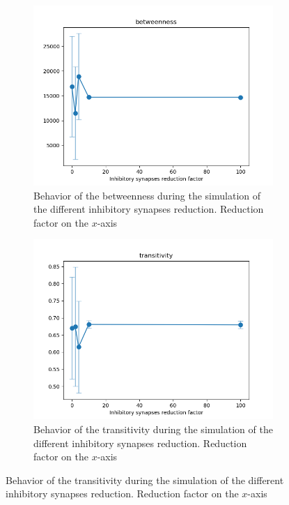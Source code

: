 \begin{figure}
  \begin{subfigure}[t]{0.48\textwidth}
    \centering
    \includegraphics[width=\textwidth]{betweenness_bin_evolution}
    \caption{Behavior of the betweenness during the simulation of the different inhibitory synapses reduction. Reduction factor on the $x$-axis}
    \label{fig:betweenness-evolution}
  \end{subfigure}
  \begin{subfigure}[t]{0.48\textwidth}
    \centering
    \includegraphics[width=\textwidth]{transitivity_bd_evolution}
    \caption{Behavior of the transitivity during the simulation of the different inhibitory synapses reduction. Reduction factor on the $x$-axis}

\end{subfigure}
\end{figure}
